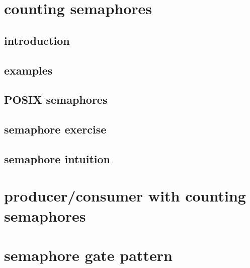 
\section{counting semaphores}

\subsection{introduction}



\subsection{examples}



\subsection{POSIX semaphores}



\subsection{semaphore exercise}


\subsection{semaphore intuition}


\section{producer/consumer with counting semaphores}


\section{semaphore gate pattern}


